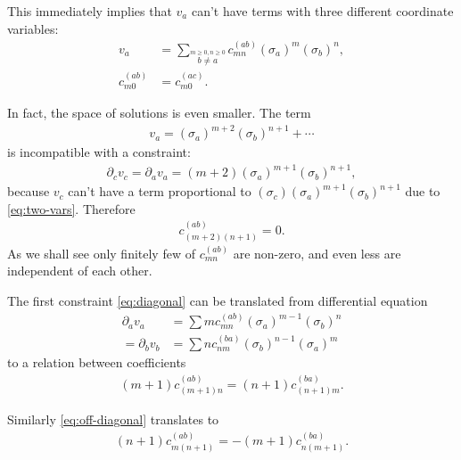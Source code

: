 \documentclass[aps,prd,final,twocolumn,floats,floatfix,nofootinbib,10pt]{revtex4-1}
\begin{document}
This immediately implies that $v_a$ can't have terms with three different
coordinate variables:
\begin{align}
  v_a & = \sum_{\overset{m \geq 0, n \geq 0}{b \neq a}}
  c^{(ab)}_{mn} (\sigma_a)^m (\sigma_b)^n, \\
  c^{(ab)}_{m0} & = c^{(ac)}_{m0}.
\end{align}

In fact, the space of solutions is even smaller. The term
\begin{align}
  v_a = (\sigma_a)^{m + 2} (\sigma_b)^{n + 1} + \cdots
\end{align}
is incompatible with a constraint:
\begin{align}
  \partial_c v_c = \partial_a v_a =
    (m + 2) (\sigma_a)^{m + 1} (\sigma_b)^{n + 1},
\end{align}
because $v_c$ can't have a term proportional to
$(\sigma_c) (\sigma_a)^{m + 1} (\sigma_b)^{n + 1}$ due to \eqref{eq:two-vars}.
Therefore
\begin{align} \label{eq:corner}
  c^{(ab)}_{(m + 2)(n + 1)} = 0.
\end{align}
As we shall see only finitely few of $c^{(ab)}_{mn}$ are non-zero, and even less
are independent of each other.

The first constraint \eqref{eq:diagonal} can be translated from differential
equation
\begin{align}
  \partial_a v_a & = \sum m c^{(ab)}_{mn} (\sigma_a)^{m - 1} (\sigma_b)^n \\
  = \partial_b v_b & = \sum n c^{(ba)}_{nm} (\sigma_b)^{n - 1} (\sigma_a)^m
\end{align}
to a relation between coefficients
\begin{align} \label{eq:first-rel}
  (m + 1) c^{(ab)}_{(m + 1) n} = (n+1) c^{(ba)}_{(n + 1) m}.
\end{align}

Similarly \eqref{eq:off-diagonal} translates to
\begin{align} \label{eq:second-rel}
  (n + 1) c^{(ab)}_{m (n + 1)} = -(m + 1) c^{(ba)}_{n (m + 1)}.
\end{align}
\end{document}
